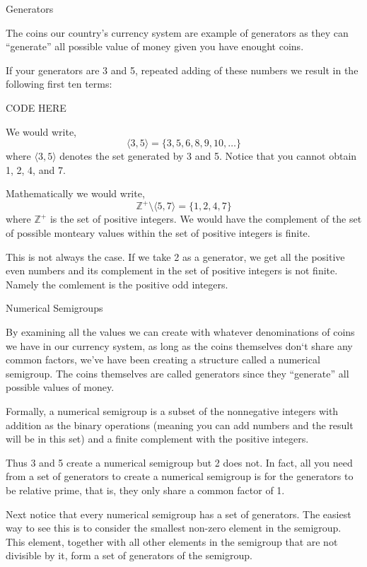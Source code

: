 \documentclass{article}
\begin{document}
Generators

The coins our country's currency system are example of generators as they can ``generate'' all possible value of money given you have enought coins. 

If your generators are 3 and 5, repeated adding of these numbers we result in the following first ten terms:

CODE HERE

We would write,
\[
	\langle 3, 5 \rangle = \{3, 5, 6, 8, 9, 10, \ldots \}
\]
where \( \langle 3, 5 \rangle\) denotes the set generated by 3 and 5. Notice that you cannot obtain 1, 2, 4, and 7.

Mathematically we would write,
\[
	\mathbb{Z^+} \setminus \langle 5, 7 \rangle = \{ 1, 2, 4, 7 \}
\]
where $\mathbb{Z}^+$ is the set of positive integers. We would have the complement of the set of possible monteary values within the set of positive integers is finite. 

This is not always the case. If we take 2 as a generator, we get all the positive even numbers and its complement in the set of positive integers is not finite. Namely the comlement is the positive odd integers. 




Numerical Semigroups


By examining all the values we can create with whatever denominations of coins we have in our currency system, as long as the coins themselves don`t share any common factors, we've have been creating a structure called a numerical semigroup. The coins themselves are called generators since they ``generate'' all possible values of money. 

Formally, a numerical semigroup is a subset of the nonnegative integers with addition as the binary operations (meaning you can add numbers and the result will be in this set) and a finite complement with the positive integers.

Thus 3 and 5 create a numerical semigroup but 2 does not. In fact, all you need from a set of generators to create a numerical semigroup is for the generators to be relative prime, that is, they only share a common factor of 1. 

Next notice that every numerical semigroup has a set of generators. The easiest way to see this is to consider the smallest non-zero element in the semigroup. This element, together with all other elements in the semigroup that are not divisible by it, form a set of generators of the semigroup.
\end{document}
